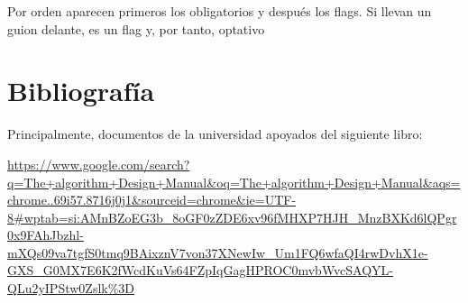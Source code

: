 \documentclass[a4paper, 12.5pt]{report}
\begin{document}
Por orden aparecen primeros los obligatorios y después los flags. Si llevan un guion delante, es un flag y, por tanto, optativo

\section{Bibliografía}

Principalmente, documentos de la universidad apoyados del siguiente libro:

\url{https://www.google.com/search?q=The+algorithm+Design+Manual&oq=The+algorithm+Design+Manual&aqs=chrome..69i57.8716j0j1&sourceid=chrome&ie=UTF-8#wptab=si:AMnBZoEG3b_8oGF0zZDE6xv96fMHXP7HJH_MnzBXKd6lQPgr0x9FAhJbzhl-mXQs09va7tgfS0tmq9BAixznV7von37XNewIw_Um1FQ6wfaQI4rwDvhX1e-GXS_G0MX7E6K2fWcdKuVs64FZpIqGagHPROC0mvbWvcSAQYL-QLu2yIPStw0Zslk%3D}
\end{document}
